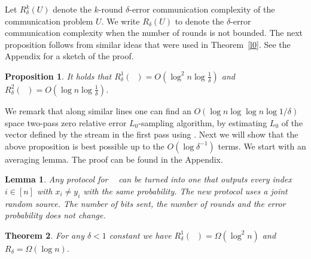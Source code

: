 \documentclass[9pt,letterpaper]{article}
\newtheorem{lemma}{Lemma}
\newtheorem{theorem}{Theorem}
\newtheorem{proposition}[theorem]{Proposition}
\theoremstyle{remark}
\DeclareMathOperator{\URn}{UR^n}
\begin{document}
Let $R^k_\delta(U)$ denote the $k$-round $\delta$-error communication
complexity of the communication problem $U$. We write $R_\delta(U)$ to denote
the $\delta$-error communication complexity when the number of rounds is not
bounded. The next proposition follows from similar ideas that were used in 
Theorem~\ref{l0}. See the Appendix for a sketch of the proof.

\begin{proposition}\label{thm:urub}
It holds that $R^1_\delta(\URn)=O(\log^2 n\log\frac{1}{\delta})$ and $R^2_\delta(\URn)=O(\log n\log\frac{1}{\delta})$.
\end{proposition}

We remark that along similar lines one can find an $O(\log n \log\log n\log1/\delta )$
space two-pass zero relative error $L_0$-sampling algorithm, by estimating  $L_0$ 
of the vector defined by the stream in the first pass using \cite{KaneNW10}. Next
 we will show that the above proposition is best possible up to the $O(\log\delta^{-1})$
terms. We start with an averaging lemma. The proof can be found in the Appendix.


\begin{lemma}\label{aver} Any protocol for $\URn$ can be turned into one that
outputs every index $i\in[n]$ with $x_i\ne y_i$ with the same probability. The
new protocol uses a joint random source. The number of bits sent, the number
of rounds and the error probability does not change.
\end{lemma}


\begin{theorem}\label{thm:urlb}
For any $\delta<1$ constant we have $R^1_\delta(\URn)=\Omega(\log^2 n)$ and
$R_\delta=\Omega(\log n)$.
\end{theorem}
\end{document}
